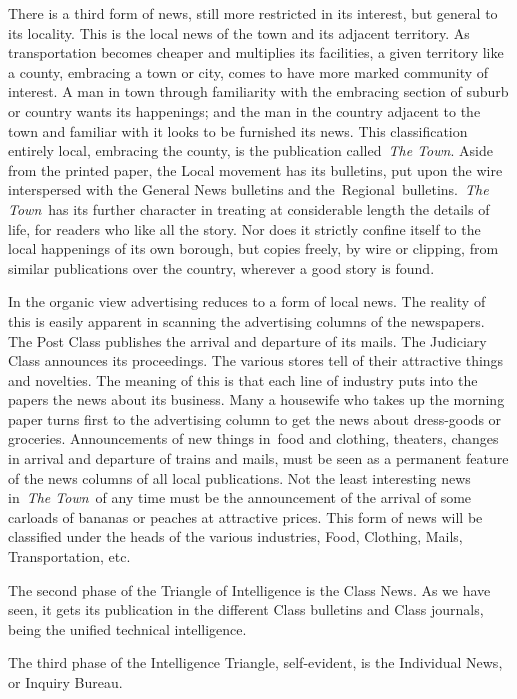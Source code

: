 \documentclass[twoside,symmetric,nobib,justified]{tufte-book}
\begin{document}
There is a third form of news, still more restricted in its interest,
but general to its locality. This is the local news of the town and its
adjacent territory. As transportation becomes cheaper and multiplies its
facilities, a given territory like a county, embracing a town or city,
comes to have more marked community of interest. A man in town through
familiarity with the embracing section of suburb or country wants its
happenings; and the man in the country adjacent to the town and familiar
with it looks to be furnished its news. This classification entirely
local, embracing the county, is the publication called~\emph{The Town}.
Aside from the printed paper, the Local movement has its bulletins, put
upon the wire interspersed with the General News bulletins and
the~Regional~bulletins.~\emph{The Town}~has its further character in
treating at considerable length the details of life, for readers who
like all the story. Nor does it strictly confine itself to the local
happenings of its own borough, but copies freely, by wire or clipping,
from similar publications over the country, wherever a good story is
found.~

In the organic view advertising reduces to a form of local news. The
reality of this is easily apparent in scanning the advertising columns
of the newspapers. The Post Class publishes the arrival and departure of
its mails. The Judiciary Class announces its proceedings. The various
stores tell of their attractive things and novelties. The meaning of
this is that each line of industry puts into the papers the news about
its business. Many a housewife who takes up the morning paper turns
first to the advertising column to get the news about dress-goods or
groceries. Announcements of new things in~food and clothing, theaters,
changes in arrival and departure of trains and mails, must be seen as a
permanent feature of the news columns of all local publications. Not the
least interesting news in~\emph{The Town}~of any time must be the
announcement of the arrival of some carloads of bananas or peaches at
attractive prices. This form of news will be classified under the heads
of the various industries, Food, Clothing, Mails, Transportation, etc.~

The second phase of the Triangle of Intelligence is the Class News. As
we have seen, it gets its publication in the different Class bulletins
and Class journals, being the unified technical intelligence.~

The third phase of the Intelligence Triangle, self-evident, is the
Individual News, or Inquiry Bureau.~
\end{document}
